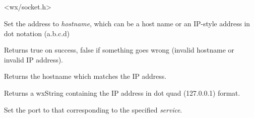 \section{}\label{wxipv4address}


\\
\\


<wx/socket.h>


%
%

\label{wxipv4addresshostname}


Set the address to {\it hostname}, which can be a host name
or an IP-style address in dot notation (a.b.c.d)


Returns true on success, false if something goes wrong
(invalid hostname or invalid IP address).


Returns the hostname which matches the IP address.

%
%

\label{wxipv4addressipaddress}


Returns a wxString containing the IP address in dot quad (127.0.0.1) format.

%
%

\label{wxipv4addressservice}


Set the port to that corresponding to the specified {\it service}.


